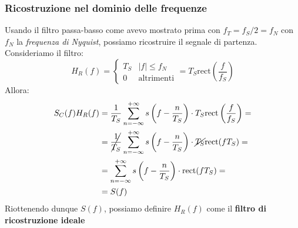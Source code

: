 \subsubsection{Ricostruzione nel dominio delle frequenze}
Usando il filtro passa-basso come avevo mostrato prima con $f_T = f_S/2 = f_N$ con $f_N$ la \textit{frequenza di Nyquist},
possiamo ricostruire il segnale di partenza. Consideriamo il filtro:
\begin{equation}
    H_R(f) = \begin{cases}
        T_S & |f| \leq f_N\\
        0   & \text{altrimenti}
    \end{cases}= T_S\text{rect}\left(\frac{f}{f_S}\right)
\end{equation}
Allora:
\begin{align*}
    S_C(f)H_R(f) &= \frac{1}{T_S} \sum_{n = -\infty}^{+\infty} s\left(f - \frac{n}{T_S}\right) \cdot T_S \text{rect}\left(\frac{f}{f_S}\right) =\\
                 &= \cancel{\frac{1}{T_S}} \sum_{n = -\infty}^{+\infty} s\left(f - \frac{n}{T_S}\right) \cdot \cancel{T_S} \text{rect}(fT_S) =\\
                 &= \sum_{n = -\infty}^{+\infty} s\left(f - \frac{n}{T_S}\right) \cdot \text{rect}(fT_S) =\\
                 &= S(f)
\end{align*}
Riottenendo dunque $S(f)$, possiamo definire $H_R(f)$ come il \textbf{filtro di ricostruzione ideale}

